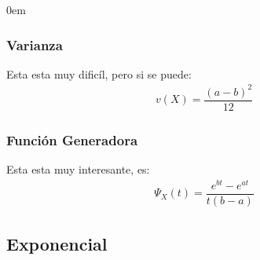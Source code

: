 \documentclass[12pt, fleqn]{report}                             %
\newenvironment{SmallIndentation}[1][0.75em]                    %
        {\begin{adjustwidth}{#1}{}\begin{footnotesize}}             %
        {\end{footnotesize}\end{adjustwidth}}                       %
\theoremstyle{break}                                            %
\begin{document}
\begin{multicols}{2}
\begin{SmallIndentation}[0em]
                    \subsubsection{Varianza}

                        Esta esta muy dificíl, pero si se puede:
                        \begin{align*}
                            v(X) = \dfrac{(a-b)^2}{12}
                        \end{align*}

                    \subsubsection{Función Generadora}

                        Esta esta muy interesante, es:
                        \begin{align*}
                            \Psi_X(t) = \dfrac{e^{bt} - e^{at}}{t(b -a)}
                        \end{align*}


                \end{SmallIndentation}
                \end{multicols}



            \clearpage
            \subsection{Exponencial}
\end{document}
